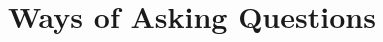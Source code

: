 \documentclass[../../main]{subfiles}
\begin{document}
\section{Ways of Asking Questions} \label{sec:}
\end{document}
